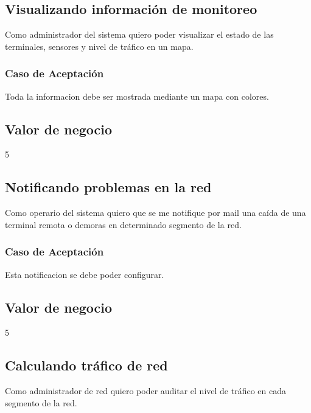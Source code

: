 \linea \subsection*{Visualizando información de monitoreo}
Como administrador del sistema quiero poder visualizar el estado de las terminales, sensores y nivel de tráfico en un mapa.
\subsubsection*{Caso de Aceptación}
Toda la informacion debe ser mostrada mediante un mapa con colores.
\subsection*{Valor de negocio}
5



\linea \subsection*{Notificando problemas en la red}
Como operario del sistema quiero que se me notifique por mail una caída de una terminal remota o demoras en determinado segmento de la red.
\subsubsection*{Caso de Aceptación}
Esta notificacion se debe poder configurar.
\subsection*{Valor de negocio}
5

\linea \subsection*{Calculando tráfico de red}
Como administrador de red quiero poder auditar el nivel de tráfico en cada segmento de la red.
